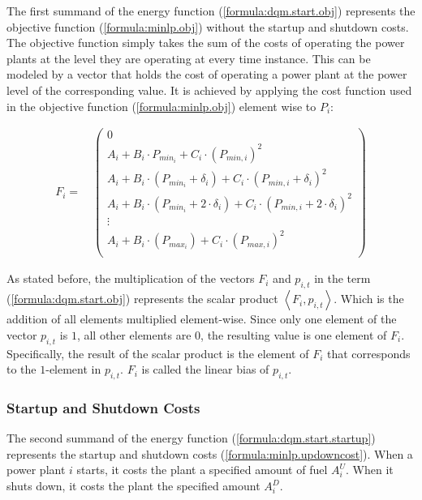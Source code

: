 The first summand of the energy function (\ref{formula:dqm.start.obj}) represents the objective function (\ref{formula:minlp.obj}) without the startup and shutdown costs.
The objective function simply takes the sum of the costs of operating the power plants at the level they are operating at every time instance.
This can be modeled by a vector that holds the cost of operating a power plant at the power level of the corresponding value.
It is achieved by applying the cost function used in the objective function (\ref{formula:minlp.obj}) element wise to $P_i$:

\begin{align}
  F_i = \quad \begin{pmatrix}
    0 \\
    A_i + B_i \cdot P_{min_i} + C_i \cdot \left( P_{min, i} \right)^2 \\
    A_i + B_i \cdot \left( P_{min_i} + \delta_i \right) + C_i \cdot \left( P_{min, i} + \delta_i \right)^2 \\
    A_i + B_i \cdot \left( P_{min_i} + 2 \cdot \delta_i \right) + C_i \cdot \left( P_{min, i} + 2 \cdot \delta_i \right)^2 \\
    \vdots \\
    A_i + B_i \cdot \left( P_{max_i} \right) + C_i \cdot \left( P_{max, i} \right)^2 \\
  \end{pmatrix}
\end{align}

As stated before, the multiplication of the vectors $F_i$ and $p_{i, t}$ in the term (\ref{formula:dqm.start.obj}) represents the scalar product $\left\langle F_i, p_{i, t} \right\rangle$.
Which is the addition of all elements multiplied element-wise.
Since only one element of the vector $p_{i, t}$ is $1$, all other elements are $0$, the resulting value is one element of $F_i$.
Specifically, the result of the scalar product is the element of $F_i$ that corresponds to the $1$-element in $p_{i, t}$.
$F_i$ is called the linear bias of $p_{i, t}$.

\subsubsection{Startup and Shutdown Costs}
\label{approach:annealing.formulate.startup}

The second summand of the energy function (\ref{formula:dqm.start.startup}) represents the startup and shutdown costs (\ref{formula:minlp.updowncost}).
When a power plant $i$ starts, it costs the plant a specified amount of fuel $A_i^U$.
When it shuts down, it costs the plant the specified amount $A_i^D$.

